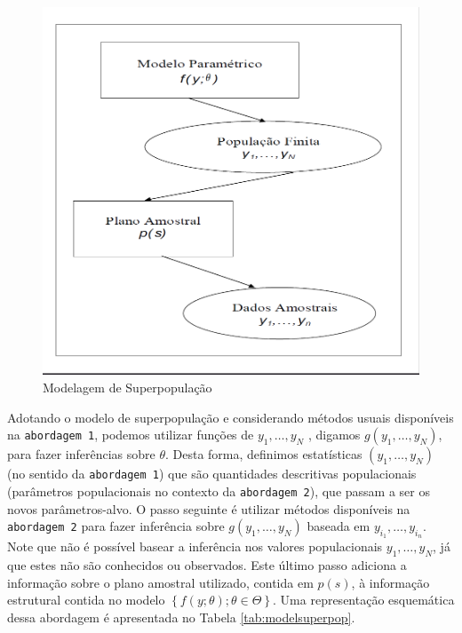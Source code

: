 \documentclass[]{book}
\theoremstyle{definition}
\theoremstyle{definition}
\theoremstyle{definition}
\theoremstyle{remark}
\begin{document}
\begin{figure}
\includegraphics[width=13in]{Figuras/fig23} \caption{Modelagem de Superpopulação}\label{fig:modsup}
\end{figure}

Adotando o modelo de superpopulação e considerando métodos usuais
disponíveis na \texttt{abordagem\ 1}, podemos utilizar funções de
\(y_{1},\ldots ,y_{N}\) , digamos \(g( y_{1},\ldots ,y_{N})\), para
fazer inferências sobre \(\theta\). Desta forma, definimos estatísticas
\(\left( y_{1},\ldots ,y_{N}\right)\) (no sentido da
\texttt{abordagem\ 1}) que são quantidades descritivas populacionais
(parâmetros populacionais no contexto da \texttt{abordagem\ 2}), que
passam a ser os novos parâmetros-alvo. O passo seguinte é utilizar
métodos disponíveis na \texttt{abordagem\ 2} para fazer inferência sobre
\(g\left( y_{1},\ldots ,y_{N}\right)\) baseada em
\(y_{i_1},\ldots ,y_{i_n}\). Note que não é possível basear a inferência
nos valores populacionais \(y_{1},\ldots ,y_{N}\), já que estes não são
conhecidos ou observados. Este último passo adiciona a informação sobre
o plano amostral utilizado, contida em \(p(s)\), à informação estrutural
contida no modelo
\(\left\{ f\left( y;\theta \right) ;\theta \in \Theta\right\}\). Uma
representação esquemática dessa abordagem é apresentada no Tabela
\ref{tab:modelsuperpop}.
\end{document}
